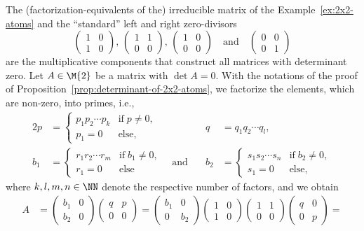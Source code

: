 \begin{remark*}
The (factorization-equivalents of the) irreducible matrix of the Example~\ref{ex:2x2-atoms} and the ``standard'' left and right zero-divisors 
\[
\begin{pmatrix} 1 & 0 \\ 1 & 0 \end{pmatrix},\,\begin{pmatrix} 1 & 1 \\ 0 & 0 \end{pmatrix},\,\begin{pmatrix} 1 & 0 \\ 0 & 0 \end{pmatrix} \quad \text{and} \quad \begin{pmatrix} 0 & 0 \\ 0 & 1 \end{pmatrix}
\]
are the multiplicative components that construct all matrices with determinant zero. Let $A \in \M{2}$ be a matrix with $\det{A}=0$. With the notations of the proof of Proposition~\ref{prop:determinant-of-2x2-atoms}, we factorize the elements, which are non-zero, into primes, i.e.,
\begin{alignat*}{2}
p &= \begin{cases} p_1p_2\cdots p_k &\text{if}\;p\neq 0, \\ p_1=0 &\text{else},  \end{cases} \quad & q &= q_1q_2 \cdots q_l,\\
b_1 &= \begin{cases} r_1r_2\cdots r_m &\text{if}\;b_1\neq 0, \\ r_1=0 &\text{else}  \end{cases} \quad \text{and} \quad &  b_2 &= \begin{cases} s_1s_2\cdots s_n &\text{if}\;b_2\neq 0, \\ s_1=0 &\text{else}, \end{cases}
\end{alignat*}
where $k,l,m, n \in \NN$ denote the respective number of factors, and we obtain
\begin{align*}
A &=  \begin{pmatrix} b_1 & 0 \\ b_2 & 0 \end{pmatrix}\begin{pmatrix} q & p \\ 0 & 0 \end{pmatrix} = \begin{pmatrix} b_1 & 0 \\ 0 & b_2 \end{pmatrix}\begin{pmatrix} 1 & 0 \\ 1 & 0 \end{pmatrix}\begin{pmatrix} 1 & 1 \\ 0 & 0 \end{pmatrix}\begin{pmatrix} q & 0 \\ 0 & p \end{pmatrix} = \\

\end{align*}
\end{remark*}

